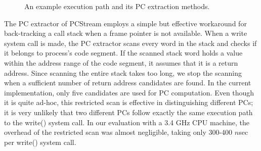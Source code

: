 \begin{figure}[t]
	\centering
	\hfill
	\caption{An example execution path and its PC extraction methods.}
	\label{fig:getpc}
\end{figure}

The PC extractor of \textsf{\small PCStream} employs a simple but effective
workaround for back-tracking a call stack when a frame pointer is not
available.  When a write system call is made, the PC extractor scans every word
in the stack and checks if it belongs to process's code segment.  If the
scanned stack word holds a value within the address range of the code segment,
it assumes that it is a return address.  Since scanning the entire stack takes
too long, we stop the scanning when a sufficient number of return address
candidates are found. In the current implementation, only five candidates are
used for PC computation.  Even though it is quite ad-hoc, this restricted scan
is effective in distinguishing different PCs; it is very unlikely that two
different PCs follow exactly the same execution path to the \textsf{\small
write()} system call.  In our evaluation with a 3.4 GHz CPU machine, the
overhead of the restricted scan was almost negligible, taking only 300-400
$n$sec per \textsf{\small write()} system call.




